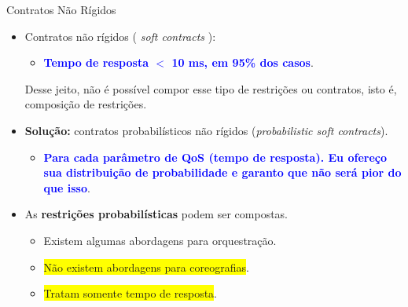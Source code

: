 \documentclass[xcolor=svgnames]{beamer}
\begin{document}
    \begin{frame}{Contratos Não Rígidos}
        \begin{itemize}
          \item <1-> Contratos não rígidos ( \emph{soft contracts} ):
                \begin{itemize}
                  \item \textcolor{blue}{\textbf{Tempo de resposta $<$ 10 ms, em 95\% dos casos}}.
                \end{itemize}
                Desse jeito, não é possível compor esse tipo de restrições ou contratos, isto é,
                composição de restrições.
          \item <2-> \textbf{Solução:} contratos probabilísticos não rígidos (\emph{probabilistic soft contracts}).
                  \begin{itemize}
                  \item \textcolor{blue}{ \textbf{Para cada parâmetro de QoS (tempo de resposta). Eu ofereço sua distribuição de
                    probabilidade e garanto que não será pior do que isso}}.
                \end{itemize}
          \item <3-> As \textbf{restrições probabilísticas} podem ser compostas.
                \begin{itemize}
                  \item Existem algumas abordagens para orquestração.
                  \item \colorbox{yellow}{Não existem abordagens para coreografias}.
                  \item \colorbox{yellow}{Tratam somente tempo de resposta}.
                \end{itemize}
        \end{itemize}
    \end{frame}



\end{document}

